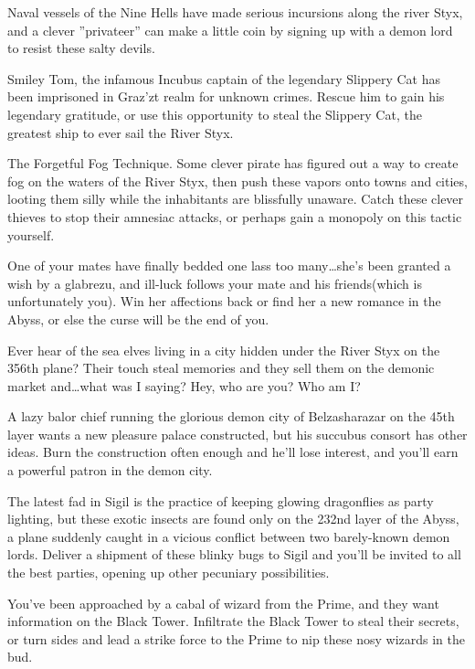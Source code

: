 \listone
	\item Naval vessels of the Nine Hells have made serious incursions along the river Styx, and a clever ''privateer'' can make a little coin by signing up with a demon lord to resist these salty devils.
	\item Smiley Tom, the infamous Incubus captain of the legendary Slippery Cat has been imprisoned in Graz'zt realm for unknown crimes. Rescue him to gain his legendary gratitude, or use this opportunity to steal the Slippery Cat, the greatest ship to ever sail the River Styx.
	\item The Forgetful Fog Technique. Some clever pirate has figured out a way to create fog on the waters of the River Styx, then push these vapors onto towns and cities, looting them silly while the inhabitants are blissfully unaware. Catch these clever thieves to stop their amnesiac attacks, or perhaps gain a monopoly on this tactic yourself.
	\item One of your mates have finally bedded one lass too many\ldots she's been granted a wish by a glabrezu, and ill-luck follows your mate and his friends(which is unfortunately you). Win her affections back or find her a new romance in the Abyss, or else the curse will be the end of you.
	\item Ever hear of the sea elves living in a city hidden under the River Styx on the 356th plane? Their touch steal memories and they sell them on the demonic market and\ldots what was I saying? Hey, who are you? Who am I?
	\item A lazy balor chief running the glorious demon city of Belzasharazar on the 45th layer wants a new pleasure palace constructed, but his succubus consort has other ideas. Burn the construction often enough and he'll lose interest, and you'll earn a powerful patron in the demon city.
	\item The latest fad in Sigil is the practice of keeping glowing dragonflies as party lighting, but these exotic insects are found only on the 232nd layer of the Abyss, a plane suddenly caught in a vicious conflict between two barely-known demon lords. Deliver a shipment of these blinky bugs to Sigil and you'll be invited to all the best parties, opening up other pecuniary possibilities.
	\item You've been approached by a cabal of wizard from the Prime, and they want information on the Black Tower. Infiltrate the Black Tower to steal their secrets, or turn sides and lead a strike force to the Prime to nip these nosy wizards in the bud.
